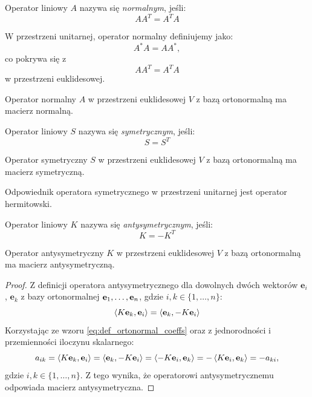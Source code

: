 \begin{definition}\label{def:real_normal_operator}
Operator liniowy $A$ nazywa się \textit{normalnym}, jeśli:
$$AA^T = A^TA$$
\end{definition}
\begin{remark}
W przestrzeni unitarnej, operator normalny definiujemy jako:
$$A^*A = AA^*,$$ co pokrywa się z $$AA^T = A^TA$$ w przestrzeni euklidesowej.
\end{remark}
\begin{theorem}
    Operator normalny $A$ w przestrzeni euklidesowej $V$ z bazą ortonormalną ma macierz normalną.
\end{theorem}

\begin{definition}\label{def:symmetric_operator}
Operator liniowy $S$ nazywa się \textit{symetrycznym}, jeśli:
$$S = S^T$$
\end{definition}
\begin{theorem}\label{theorem:sym_op_has_same_matrix}
    Operator symetryczny $S$ w przestrzeni euklidesowej $V$ z bazą ortonormalną ma macierz symetryczną.
\end{theorem}

\begin{remark}
Odpowiednik operatora symetrycznego w przestrzeni unitarnej jest operator hermitowski.
\end{remark}

\begin{definition}\label{def:skew_symmetric_operator}
Operator liniowy $K$ nazywa się \textit{antysymetrycznym}, jeśli:
$$K = -K^T$$
\end{definition}

\begin{theorem}
    Operator antysymetryczny $K$ w przestrzeni euklidesowej $V$ z bazą ortonormalną ma macierz antysymetryczną.
\end{theorem}
\begin{proof}
    Z definicji operatora antysymetrycznego dla dowolnych dwóch wektorów $\textbf{e}_i$, $\textbf{e}_k$ z bazy ortonormalnej $\mathbf{e}_1, \ldots, \mathbf{e}_n$, gdzie $i, k \in \{1, \dots, n\}$:
    $$\left\langle K\textbf{e}_k, \textbf{e}_i \right\rangle = \left\langle \textbf{e}_k, -K\textbf{e}_i \right\rangle$$
    Korzystając ze wzoru \eqref{eq:def_ortonormal_coeffs} oraz z jednorodności i przemienności iloczynu skalarnego:
    $$ a_{ik} = \left\langle K\textbf{e}_k, \textbf{e}_i \right\rangle = \left\langle \textbf{e}_k, -K\textbf{e}_i \right\rangle = \left\langle -K\textbf{e}_i, \textbf{e}_k \right\rangle = -\left\langle K\textbf{e}_i, \textbf{e}_k \right\rangle = -a_{ki}, $$ gdzie $i, k \in \{1, \dots, n\}$. Z tego wynika, że operatorowi antysymetrycznemu odpowiada macierz antysymetryczna.
\end{proof}

